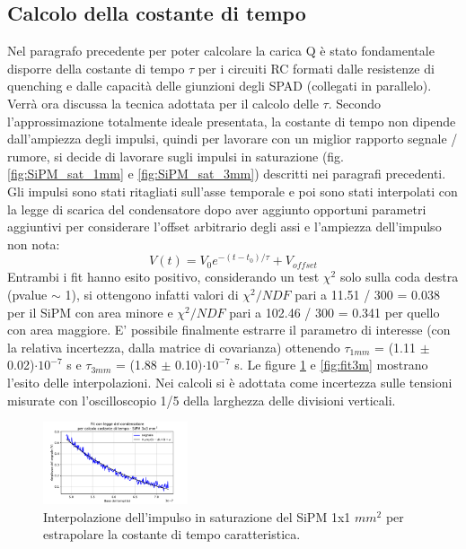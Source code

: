 \documentclass[journal]{IEEEtran}
\begin{document}
\subsection{Calcolo della costante di tempo}
Nel paragrafo precedente per poter calcolare la carica Q è stato fondamentale disporre della costante di tempo $\tau$ per i circuiti RC formati dalle resistenze di quenching e dalle capacità delle giunzioni degli SPAD (collegati in parallelo). Verrà ora discussa la tecnica adottata per il calcolo delle $\tau$. Secondo l'approssimazione totalmente ideale presentata, la costante di tempo non dipende dall'ampiezza degli impulsi, quindi per lavorare con un miglior rapporto segnale / rumore, si decide di lavorare sugli impulsi in saturazione (fig. \ref{fig:SiPM_sat_1mm} e \ref{fig:SiPM_sat_3mm}) descritti nei paragrafi precedenti. Gli impulsi sono stati ritagliati sull'asse temporale e poi sono stati interpolati con la legge di scarica del condensatore dopo aver aggiunto opportuni parametri aggiuntivi per considerare l'offset arbitrario degli assi e l'ampiezza dell'impulso non nota:
\begin{equation}
    V(t) = V_0 e^{-(t-t_0)/\tau} + V_{offset}
\end{equation}
Entrambi i fit hanno esito positivo, considerando un test $\chi^2$ solo sulla coda destra (pvalue $\sim$ 1), si ottengono infatti valori di $\chi^2 / NDF$ pari a 11.51  /  300 = 0.038 per il SiPM con area minore e $\chi^2 / NDF$ pari a 102.46 /  300 = 0.341 per quello con area maggiore. E' possibile finalmente estrarre il parametro di interesse (con la relativa incertezza, dalla matrice di covarianza) ottenendo $\tau_{1mm}$ = (1.11 $\pm$ 0.02)$\cdot 10^{-7}$ s e $\tau_{3mm}$ = (1.88 $\pm$ 0.10)$\cdot 10^{-7}$ s. Le figure \ref{fig:fit1m} e \ref{fig:fit3m} mostrano l'esito delle interpolazioni. Nei calcoli si è adottata come incertezza sulle tensioni misurate con l'oscilloscopio 1/5 della larghezza delle divisioni verticali.

\begin{figure}[H]%
\begin{center}
\includegraphics[width=0.38\textwidth]{analysis/output/SiPM_fit_3mm.pdf}
\caption{Interpolazione dell'impulso in saturazione del SiPM 1x1 $mm^2$ per estrapolare la costante di tempo caratteristica.}
\label{fig:fit1m}
\end{center}
\end{figure}
\end{document}
